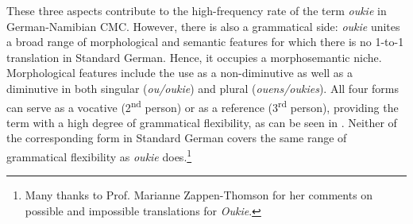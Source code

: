 \documentclass[output=paper]{langsci/langscibook}
\begin{document}
These three aspects contribute to the high-frequency rate of the term \textit{oukie} in German-Namibian CMC. However, there is also a grammatical side: \textit{oukie} unites a broad range of morphological and semantic features for which there is no 1-to-1 translation in Standard German. Hence, it occupies a morphosemantic niche. Morphological features include the use as a non-diminutive as well as a diminutive in both singular (\textit{ou/oukie}) and plural (\textit{ouens/oukies}). All four forms can serve as a vocative (2\textsuperscript{nd} person) or as a reference (3\textsuperscript{rd} person), providing the term with a high degree of grammatical flexibility, as can be seen in . Neither of the corresponding form in Standard German covers the same range of grammatical flexibility as \textit{oukie} does.\footnote{Many thanks to Prof. Marianne Zappen-Thomson for her comments on possible and impossible translations for \textit{Oukie}.} 
\end{document}
